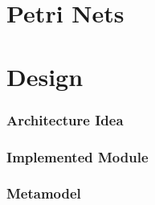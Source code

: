 \section*{Petri Nets}



\section{Design}
\begin{frame}
  \centering
  \hspace{-1cm}
  \huge
\end{frame}

\begin{frame}
  \frametitle{Architecture Idea}
  
\end{frame}

\begin{frame}
  \frametitle{Implemented Module}
  \centering
  \hspace{-1cm}
  
\end{frame}


\begin{frame}
  \frametitle{Metamodel}
  \centering
  \hspace{-1cm}
  
\end{frame}


